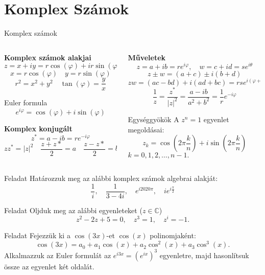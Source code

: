 \documentclass[10pt]{beamer}
\newcommand{\C}[0]{\mathbb{C}}
\begin{document}
\section{Komplex Számok}
\begin{frame}[t]{Komplex számok}
\begin{columns}[t]
\begin{column}{0.48\linewidth}
{\bf Komplex számok alakjai}
\[z = x + iy = r\cos(\varphi) + ir\sin(\varphi)\]
\[x = r\cos(\varphi) \quad y = r\sin(\varphi)\]
\[r^2 = x^2 + y^2 \quad \tan(\varphi) = \frac{y}{x}\]
\begin{block}{Euler formula}
 \[e^{i\varphi} = \cos(\varphi) + i\sin(\varphi)\]
\end{block}
{\bf Komplex konjugált}
\[z^* = a - ib = r e^{-i\varphi}\]
\[z z^* = |z|^2 \quad \frac{z + z*}{2} = a \quad \frac{z - z*}{2} = b\]
\end{column}

\begin{column}{0.48\linewidth}
{\bf Műveletek}
\[z = a + ib = re^{i\varphi}, \quad w = c + id = se^{i\theta}\]
\[z \pm w = (a+c) \pm i (b+d)\] 
\[z w = (ac - bd) + i (ad + bc) = rse^{i(\varphi + \theta)}\]
\[\frac{1}{z} = \frac{z^*}{|z|^2} = \frac{a-ib}{a^2 + b^2} = \frac{1}{r} e^{-i\varphi}\]
\begin{block}{Egységgyökök}
A $z^n = 1$ egyenlet megoldásai:
\[z_k = \cos\left(2\pi\frac{k}{n}\right) + i\sin\left(2\pi\frac{k}{n}\right)\]
$k=0,1,2,\dots,n-1.$ 
\end{block}
\end{column}
\end{columns}    
\end{frame}

\begin{frame}
\begin{center}
\resizebox{!}{\textheight}{%
\begin{tikzpicture}[scale=4.0,cap=round,>=latex]
 
\end{tikzpicture}
}
\end{center}
\end{frame}

\begin{frame}[t]{}
\begin{exampleblock}{Feladat}
Határozzuk meg az alábbi komplex számok algebrai alakját:
\[ \frac{1}{i}, \quad \dfrac{1}{3-4i}, \quad e^{i2020\pi}, \quad ie^{i\frac{\pi}{2}}\]
\end{exampleblock}

\begin{exampleblock}{Feladat}
Oljduk meg az alábbi egyenleteket ($z\in\C$)
\[z^2 - 2z + 5 = 0, \quad z^3 = 1, \quad z^i = -1.\]
\end{exampleblock}

\begin{exampleblock}{Feladat}
Fejezzük ki a $\cos(3x)$-et $\cos(x)$ polinomjaként:
\[\cos(3x) = a_0 + a_1 \cos(x) + a_2 \cos^2(x) + a_3 \cos^3(x).\]
{\tiny Alkalmazzuk az Euler formulát az $e^{i3x} = (e^{ix})^3$ egyenletre, majd hasonlítsuk össze az egyenlet két oldalát.}
\end{exampleblock}
\end{frame}
\end{document}
